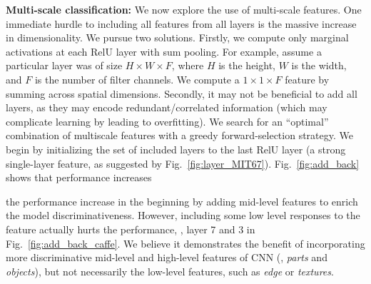 \documentclass[10pt,twocolumn,letterpaper]{article}
\begin{document}

{\bf Multi-scale classification:} We now explore the use of multi-scale features. One immediate hurdle to including all features from all layers is the massive increase in dimensionality. We pursue two solutions. Firstly, we compute only marginal activations at each RelU layer with sum pooling. For example, assume a particular layer was of size $H \times W \times F$, where $H$ is the height, $W$ is the width, and $F$ is the number of filter channels. We compute a $1 \times 1 \times F$ feature by summing across spatial dimensions. Secondly, it may not be beneficial to add all layers, as they may encode redundant/correlated information (which may complicate learning by leading to overfitting). We search for an ``optimal'' combination of multiscale features with a greedy forward-selection strategy. We begin by initializing the set of included layers to the last RelU layer (a strong single-layer feature, as suggested by Fig.~\ref{fig:layer_MIT67}).
Fig.~\ref{fig:add_back} shows that performance increases

 the performance increase in the beginning by adding mid-level features to enrich the model discriminativeness. However, including some low level responses to the feature actually hurts the performance, \ie, layer 7 and 3 in Fig.~\ref{fig:add_back_caffe}. We believe it demonstrates the benefit of incorporating more discriminative mid-level and high-level features of CNN (\ie, \textit{parts} and \textit{objects}), but not necessarily the low-level features, such as \textit{edge} or \textit{textures}. 

\end{document}

